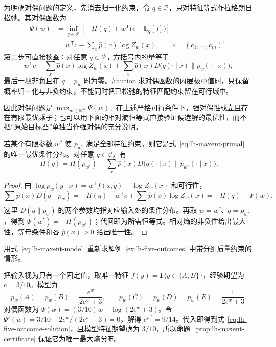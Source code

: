 为明确对偶问题的定义，先消去归一化约束，令 $q\in\mathcal P$，只对特征等式作拉格朗日松弛。其对偶函数为
\begin{equation}
\begin{aligned}
\Psi(w)&=\inf_{q\in\mathcal P}
\left[-H(q)+w^{\mathsf T}\bigl(c-\mathbb E_q[f]\bigr)\right]\\
&=w^{\mathsf T}c-\sum_x\widehat p(x)\log Z_w(x),
\qquad c=(c_1,\ldots,c_m)^{\mathsf T}.
\end{aligned}
\label{eq:lh-maxent-dual}
\end{equation}
第二步可直接核查：对任意 $q\in\mathcal P$，方括号内的量等于
\[
w^{\mathsf T}c-\sum_x\widehat p(x)\log Z_w(x)
+\sum_x\widehat p(x)D\bigl(q(\cdot\mid x)\|p_w(\cdot\mid x)\bigr),
\]
最后一项非负且在 $q=p_w$ 时为零。\emph[caution]{求对偶函数的内层极小值时，只保留概率归一化与非负约束，不能同时把已松弛的特征匹配约束留在可行域中。}

因此对偶问题是 $\max_{w\in\mathbb R^m}\Psi(w)$。在上述严格可行条件下，强对偶性成立且存在有限最优乘子；也可以用下面的相对熵恒等式直接验证候选解的最优性，而不把“原始目标凸”单独当作强对偶的充分说明。

\begin{proposition}[最大熵解的相对熵验证]
\label{prop:lh-maxent-certificate}
若某个有限参数 $w^*$ 使 $p_{w^*}$ 满足全部特征约束，则它是式~\eqref{eq:lh-maxent-primal} 的唯一最优条件分布。对任意 $q\in\mathcal C$，有
\begin{equation}
H(q)=H(p_{w^*})-\sum_x\widehat p(x)
D\bigl(q(\cdot\mid x)\|p_{w^*}(\cdot\mid x)\bigr).
\label{eq:lh-maxent-kl-certificate}
\end{equation}
\end{proposition}
\begin{proof}
由 $\log p_w(y\mid x)=w^{\mathsf T}f(x,y)-\log Z_w(x)$ 和可行性，
\[
\sum_x\widehat p(x)D(q\|p_w)
=-H(q)-w^{\mathsf T}c+\sum_x\widehat p(x)\log Z_w(x)
=-H(q)-\Psi(w).
\]
这里 $D(q\|p_w)$ 的两个参数均指对应输入处的条件分布。再取 $w=w^*$、$q=p_{w^*}$，得到 $\Psi(w^*)=-H(p_{w^*})$；代回即为所需恒等式。相对熵的非负性给出最大性，等号条件和各 $\widehat p(x)>0$ 给出唯一性。
\end{proof}

\begin{example}
\label{ex:lh-five-outcomes-dual}
用式~\eqref{eq:lh-maxent-model} 重新求解例~\ref{ex:lh-five-outcomes} 中带分组质量约束的情形。
\end{example}
\begin{solve}
把输入视为只有一个固定值，取唯一特征 $f(y)=\mathbf1\{y\in\{A,B\}\}$，经验期望为 $c=3/10$。模型为
\[
p_w(A)=p_w(B)=\frac{e^w}{2e^w+3},\qquad
p_w(C)=p_w(D)=p_w(E)=\frac1{2e^w+3}.
\]
对偶函数为 $\Psi(w)=(3/10)w-\log(2e^w+3)$。令 $\Psi'(w)=3/10-2e^w/(2e^w+3)=0$，解得 $e^{w^*}=9/14$。代入即得到式~\eqref{eq:lh-five-outcome-solution}，且模型特征期望确为 $3/10$，所以命题~\ref{prop:lh-maxent-certificate} 保证它为唯一最大熵分布。
\end{solve}

